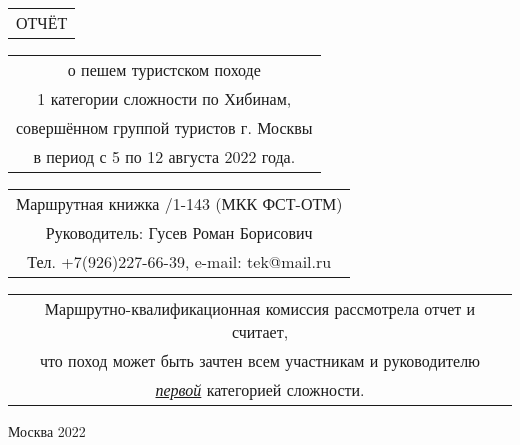 \begin{titlepage}
    \noindent\parbox{\linewidth}
    {
        \vspace{100pt}
        \Large
        \begin{center} \begin{tabular}{c}
            ОТЧЁТ\\
        \end{tabular}  \end{center}
    }
    \noindent\parbox{\linewidth}
    {
        \vspace{10pt}
        \large
        \begin{center} \begin{tabular}{c}
            о пешем туристском походе\\
            1 категории сложности по Хибинам,\\
            совершённом группой туристов г. Москвы\\
            в период с 5 по 12 августа 2022 года.
        \end{tabular}  \end{center}
    }
    \noindent\parbox{\linewidth}
    {
        \vspace{20pt}
        \large
        \begin{center} \begin{tabular}{c}
            Маршрутная книжка \textnumero1/1-143 (МКК ФСТ-ОТМ)\\
            Руководитель: Гусев Роман Борисович\\
            Тел. +7(926)227-66-39, e-mail: tek@mail.ru\\
        \end{tabular}  \end{center}
    }
    \noindent\parbox{\linewidth}
    {
        \vspace{20pt}
        \normalsize
        \begin{center} \begin{tabular}{c}
            Маршрутно-квалификационная комиссия рассмотрела отчет и считает,\\
            что поход может быть зачтен всем участникам и руководителю\\
            \underline{\textit{\large{первой}}} категорией сложности.
        \end{tabular}  \end{center}
    }
    \noindent\parbox{\linewidth}
    {
        \vspace{180pt}
        \large
        \begin{center}
            Москва 2022
        \end{center}
    }
\end{titlepage}

\shipout\null
